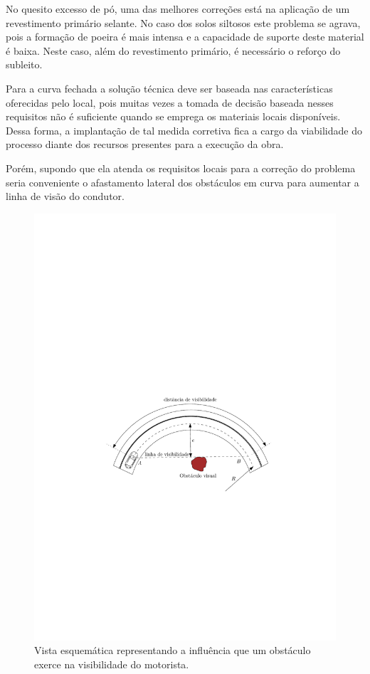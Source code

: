 
 No quesito excesso de pó, uma das melhores correções está na aplicação de um revestimento primário selante. No caso dos solos siltosos este problema se agrava, pois a formação de poeira é mais intensa e a capacidade de suporte deste material é baixa. Neste caso, além do revestimento primário, é necessário o reforço do subleito.
 
 Para a curva fechada a solução técnica deve ser baseada nas características oferecidas pelo local, pois muitas vezes a tomada de decisão baseada nesses requisitos não é suficiente quando se emprega os materiais locais disponíveis. Dessa forma, a implantação de tal medida corretiva fica a cargo da viabilidade do processo diante dos recursos presentes para a execução da obra.
 
 Porém, supondo que ela atenda os requisitos locais para a correção do problema seria conveniente o afastamento lateral dos obstáculos em curva para aumentar a linha de visão do condutor.
 
 \begin{figure}[ht]
 	\centering
 	\includegraphics[scale=1.3]{../../images/draw_1}
 	\caption{Vista esquemática representando a influência que um obstáculo exerce na visibilidade do motorista.}
 \end{figure}